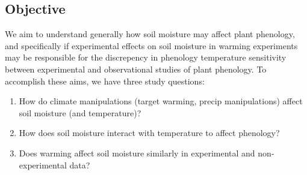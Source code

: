 \documentclass{article}
\begin{document}
\clearpage
\begin{singlespace}
\section{Objective}
We aim to understand generally how soil moisture may affect plant phenology, and specifically if experimental effects on soil moisture in warming experiments may be responsible for the discrepency in phenology temperature sensitivity between experimental and observational studies of plant phenology. To accomplish these aims, we have three study questions:
\begin{enumerate}
\item{How do climate manipulations (target warming, precip manipulations) affect soil moisture (and temperature)?}
\item{How does soil moisture interact with temperature to affect phenology?}
\item{Does warming affect soil moisture similarly in experimental and non-experimental data?}
\end{enumerate}
\end{singlespace}
\end{document}
